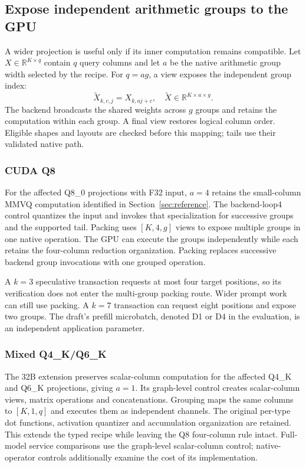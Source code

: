\subsection{Expose independent arithmetic groups to the GPU}
\label{sec:recipes}
A wider projection is useful only if its inner computation remains compatible. Let $X\in\mathbb{R}^{K\times q}$ contain $q$ query columns and let $a$ be the native arithmetic group width selected by the recipe. For $q=ag$, a view exposes the independent group index:
\begin{equation}
 \widetilde X_{k,c,j}=X_{k,aj+c},\quad
 \widetilde X\in\mathbb{R}^{K\times a\times g}.
 \label{eq:packing}
\end{equation}
The backend broadcasts the shared weights across $g$ groups and retains the computation within each group. A final view restores logical column order. Eligible shapes and layouts are checked before this mapping; tails use their validated native path.

\subsubsection{CUDA Q8}
For the affected Q8\_0 projections with F32 input, $a=4$ retains the small-column MMVQ computation identified in Section~\ref{sec:reference}. The backend-loop4 control quantizes the input and invokes that specialization for successive groups and the supported tail. Packing uses $[K,4,g]$ views to expose multiple groups in one native operation. The GPU can execute the groups independently while each retains the four-column reduction organization. Packing replaces successive backend group invocations with one grouped operation.

A $k=3$ speculative transaction requests at most four target positions, so its verification does not enter the multi-group packing route. Wider prompt work can still use packing. A $k=7$ transaction can request eight positions and expose two groups. The draft's prefill microbatch, denoted D1 or D4 in the evaluation, is an independent application parameter.

\subsubsection{Mixed Q4\_K/Q6\_K}
The 32B extension preserves scalar-column computation for the affected Q4\_K and Q6\_K projections, giving $a=1$. Its graph-level control creates scalar-column views, matrix operations and concatenations. Grouping maps the same columns to $[K,1,q]$ and executes them as independent channels. The original per-type dot functions, activation quantizer and accumulation organization are retained. This extends the typed recipe while leaving the Q8 four-column rule intact. Full-model service comparisons use the graph-level scalar-column control; native-operator controls additionally examine the cost of its implementation.

